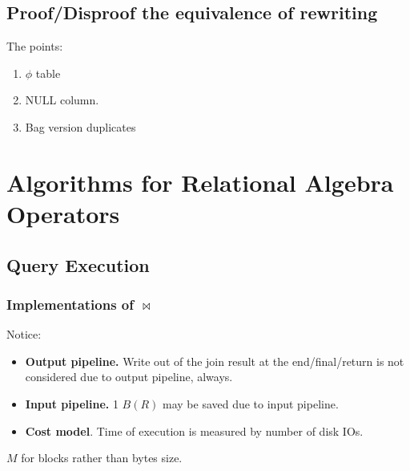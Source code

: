 \documentclass[a4paper]{report}
\begin{document}
\subsection{Proof/Disproof the equivalence of rewriting}
The  points: 
\begin{enumerate}
\item $\phi$ table
\item NULL column. 
\item Bag version duplicates
\end{enumerate}



\section{Algorithms for Relational Algebra Operators}
\subsection{Query Execution}\label{sec:queryExec}
\subsubsection{Implementations of $\bowtie$}

Notice:
\begin{itemize}
\item \textbf{Output pipeline.} Write out of the join result at the end/final/return is not considered due to output pipeline, always.
\item \textbf{Input pipeline.} 1 $B(R)$ may be saved due to input pipeline. 
\item \textbf{Cost model}. Time of execution is measured by number of disk IOs. 
\end{itemize}

$M$ for blocks rather than bytes size. 
\end{document}
